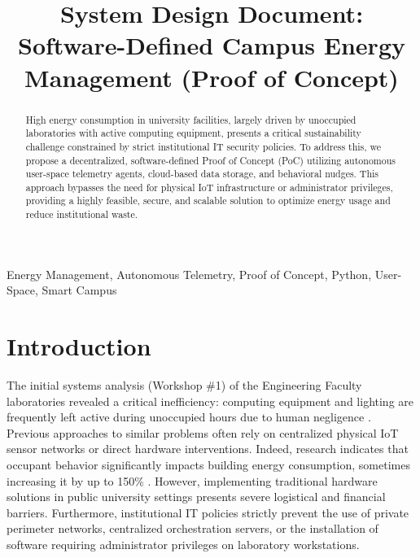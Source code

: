 \documentclass[conference]{IEEEtran}
\begin{document}
\title{System Design Document: \\ Software-Defined Campus Energy Management (Proof of Concept)}

\author{
}

\maketitle

\begin{abstract}
High energy consumption in university facilities, largely driven by unoccupied laboratories with active computing equipment, presents a critical sustainability challenge constrained by strict institutional IT security policies. To address this, we propose a decentralized, software-defined Proof of Concept (PoC) utilizing autonomous user-space telemetry agents, cloud-based data storage, and behavioral nudges. This approach bypasses the need for physical IoT infrastructure or administrator privileges, providing a highly feasible, secure, and scalable solution to optimize energy usage and reduce institutional waste.
\end{abstract}

\begin{IEEEkeywords}
Energy Management, Autonomous Telemetry, Proof of Concept, Python, User-Space, Smart Campus
\end{IEEEkeywords}

\section{Introduction}
The initial systems analysis (Workshop \#1) of the Engineering Faculty laboratories revealed a critical inefficiency: computing equipment and lighting are frequently left active during unoccupied hours due to human negligence \cite{b1}. Previous approaches to similar problems often rely on centralized physical IoT sensor networks or direct hardware interventions. Indeed, research indicates that occupant behavior significantly impacts building energy consumption, sometimes increasing it by up to 150\% \cite{b2}. However, implementing traditional hardware solutions in public university settings presents severe logistical and financial barriers. Furthermore, institutional IT policies strictly prevent the use of private perimeter networks, centralized orchestration servers, or the installation of software requiring administrator privileges on laboratory workstations.
\end{document}
